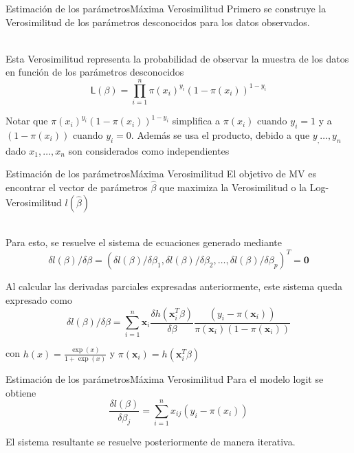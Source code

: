 \documentclass[]{beamer}
\begin{document}
\begin{frame}{Estimación de los parámetros}{Máxima Verosimilitud}
    Primero se construye la Verosimilitud de los parámetros desconocidos para los datos observados.\\~\   
    
    Esta Verosimilitud representa la probabilidad de observar la muestra de los datos en función 
    de los parámetros desconocidos
    $$\mathsf{L}(\beta)=\prod_{i=1}^{n}\pi(x_i)^{y_i}(1-\pi(x_i))^{1-y_i}$$

    Notar que $\pi(x_i)^{y_i}(1-\pi(x_i))^{1-y_i}$ simplifica a $\pi(x_i)$ cuando $y_i=1$ y a 
    $(1-\pi(x_i))$ cuando $y_i=0$. Además se usa el producto, debido a que $y_,\ldots ,y_n$ dado 
    $x_1,\ldots , x_n$ son considerados como independientes

\end{frame}

\begin{frame}{Estimación de los parámetros}{Máxima Verosimilitud}
    El objetivo de MV es encontrar el vector de parámetros $\widehat{\beta}$ que maximiza la 
    Verosimilitud o la Log-Verosimilitud $l(\widehat{\beta})$\\~\  

    Para esto, se resuelve el sistema de ecuaciones generado mediante 
    $$\delta l(\beta)/\delta \beta = (\delta l(\beta)/\delta \beta_1,\delta l(\beta)/\delta \beta_2,\ldots , \delta l(\beta)/\delta \beta_p   )^T=\mathbf{0}$$

    Al calcular las derivadas parciales expresadas anteriormente, este sistema queda expresado como 
    $$\delta l(\beta)/\delta \beta = \sum_{i=1}^{n}\mathbf{x}_i\frac{\delta h(\mathbf{x}_i^T\beta )}{\delta \beta }\frac{(y_i -\pi(\mathbf{x}_i))}{\pi(\mathbf{x}_i)(1-\pi(\mathbf{x}_i))}$$ 

    con $h(x)=\frac{\exp(x)}{1+\exp(x)}$ y $\pi(\mathbf{x}_i)=h(\mathbf{x}_i^T\beta )$
\end{frame}

\begin{frame}{Estimación de los parámetros}{Máxima Verosimilitud}
    Para el modelo logit se obtiene 
    $$\frac{\delta l(\beta)}{\delta \beta_j}=\sum_{i=1}^n x_{ij}(y_i-\pi(x_i))$$

    El sistema resultante se resuelve posteriormente de manera iterativa.
\end{frame}
\end{document}
